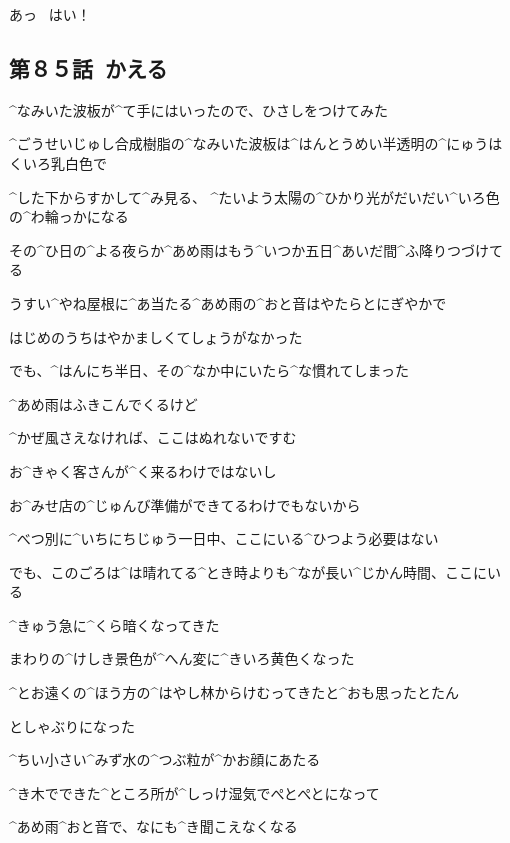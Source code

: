 \Kokone あっ
\ はい！


\subsection{第８５話\ かえる}

\page[115]
\Alpha ^{なみいた}{波板}が^{て}{手}にはいったので、ひさしをつけてみた

\Alpha ^{ごうせいじゅし}{合成樹脂}の^{なみいた}{波板}は^{はんとうめい}{半透明}の^{にゅうはくいろ}{乳白色}で

\Alpha ^{した}{下}からすかして^{み}{見}る、
^{たいよう}{太陽}の^{ひかり}{光}がだいだい^{いろ}{色}の^{わ}{輪}っかになる

\page[116]
\Alpha その^{ひ}{日}の^{よる}{夜}らか^{あめ}{雨}はもう^{いつか}{五日}^{あいだ}{間}^{ふ}{降}りつづけてる

\Alpha うすい^{やね}{屋根}に^{あ}{当}たる^{あめ}{雨}の^{おと}{音}はやたらとにぎやかで

\Alpha はじめのうちはやかましくてしょうがなかった

\Alpha でも、^{はんにち}{半日}、その^{なか}{中}にいたら^{な}{慣}れてしまった

\page[117]
\Alpha ^{あめ}{雨}はふきこんでくるけど

\Alpha ^{かぜ}{風}さえなければ、ここはぬれないですむ

\page[118]
\Alpha お^{きゃく}{客}さんが^{く}{来}るわけではないし

\Alpha お^{みせ}{店}の^{じゅんび}{準備}ができてるわけでもないから

\Alpha ^{べつ}{別}に^{いちにちじゅう}{一日中}、ここにいる^{ひつよう}{必要}はない

\Alpha でも、このごろは^{は}{晴}れてる^{とき}{時}よりも^{なが}{長}い^{じかん}{時間}、ここにいる

\page[119]
\Alpha ^{きゅう}{急}に^{くら}{暗}くなってきた

\Alpha まわりの^{けしき}{景色}が^{へん}{変}に^{きいろ}{黄色}くなった

\page[120]
\Alpha ^{とお}{遠}くの^{ほう}{方}の^{はやし}{林}からけむってきたと^{おも}{思}ったとたん

\Alpha としゃぶりになった

\Alpha ^{ちい}{小}さい^{みず}{水}の^{つぶ}{粒}が^{かお}{顔}にあたる

\page[121]
\Alpha ^{き}{木}でできた^{ところ}{所}が^{しっけ}{湿気}でぺとぺとになって

\Alpha ^{あめ}{雨}^{おと}{音}で、なにも^{き}{聞}こえなくなる

